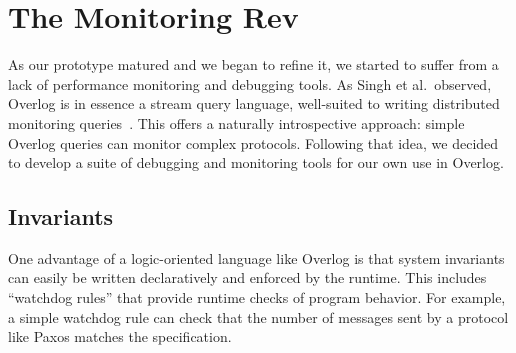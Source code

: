 \section{The Monitoring Rev}
\label{sec:manage}
As our \BOOMA prototype matured and we began to refine it, we started to suffer
from a lack of performance monitoring and debugging tools. As Singh et al.\
observed, Overlog is in essence a stream query language, well-suited to writing
distributed monitoring queries~\cite{singh-eurosys}.  This offers a naturally
introspective approach: simple Overlog queries can monitor complex protocols.
Following that idea, we decided to develop a suite of debugging and monitoring
tools for our own use in Overlog.



\subsection{Invariants}
\label{sec:invar}
One advantage of a logic-oriented language like Overlog is that system
invariants can easily be written declaratively and enforced by the runtime.
This includes ``watchdog rules'' that provide runtime checks of program behavior.
For example, a simple watchdog rule can check that the number of messages sent by a
protocol like Paxos matches the specification.  

